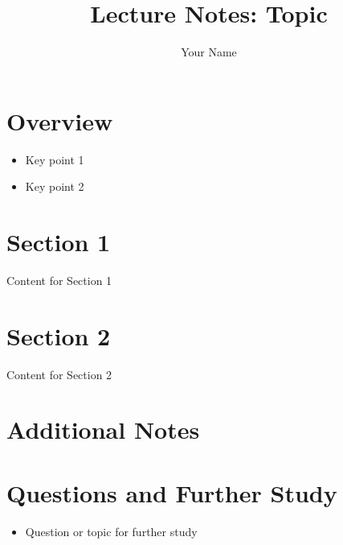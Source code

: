 \documentclass[12pt,a4paper]{article}
\title{Lecture Notes: Topic}
\author{Your Name}
\date{}
\newcounter{keyconcept}
\newcommand{\keyconcept}[1]{%
  \refstepcounter{keyconcept}%
  \par\noindent\textbf{Key Concept \thekeyconcept:} #1\par
}
\newtheorem{theorem}{Theorem}[section]
\newtheorem{definition}[theorem]{Definition}
\begin{document}
\maketitle

\section{Overview}
\begin{tcolorbox}[colback=yellow!10!white,colframe=yellow!50!black,title=Key Points]
  \begin{itemize}
    \item Key point 1
    \item Key point 2
  \end{itemize}
\end{tcolorbox}

\section{Section 1}
Content for Section 1

\section{Section 2} 
Content for Section 2
\section{Additional Notes}

\section{Questions and Further Study}
\begin{itemize}
  \item Question or topic for further study
\end{itemize}
\end{document}
